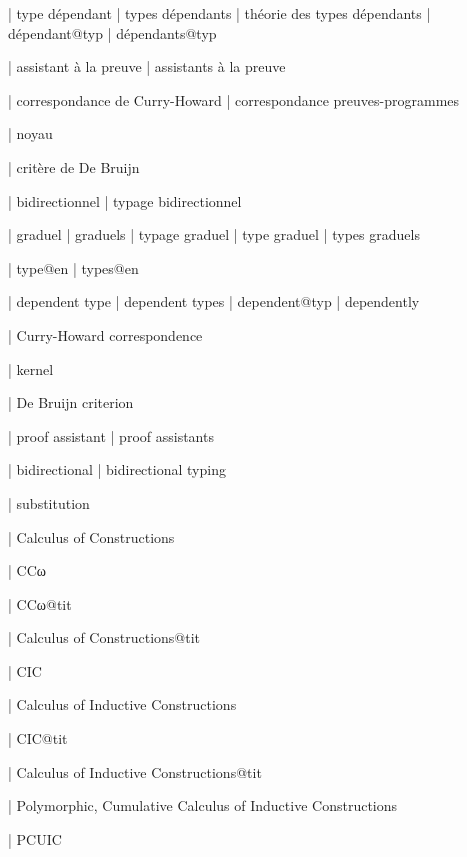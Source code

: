   | type dépendant
  | types dépendants
  | théorie des types dépendants
  | dépendant@typ
  | dépendants@typ

  | assistant à la preuve
  | assistants à la preuve

  | correspondance de Curry-Howard
  | correspondance preuves-programmes

  | noyau

  | critère de De Bruijn

  | bidirectionnel
  | typage bidirectionnel

  | graduel
  | graduels
  | typage graduel
  | type graduel
  | types graduels


  | type@en
  | types@en

  | dependent type
  | dependent types
  | dependent@typ
  | dependently

  | Curry-Howard correspondence

  | kernel

  | De Bruijn criterion

  | proof assistant
  | proof assistants

  | bidirectional
  | bidirectional typing


  | substitution


  | Calculus of Constructions

  | CCω

  | CCω@tit

  | Calculus of Constructions@tit

  | CIC

  | Calculus of Inductive Constructions

  | CIC@tit

  | Calculus of Inductive Constructions@tit

  | Polymorphic, Cumulative Calculus of Inductive Constructions

  | PCUIC

